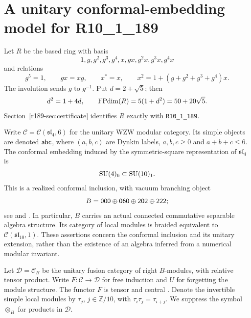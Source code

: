 \section{A unitary conformal-embedding model for R10\_1\_189}\label{sec:r189-model}

Let $R$ be the based ring with basis
\[
  1,g,g^2,g^3,g^4,x,gx,g^2x,g^3x,g^4x
\]
and relations
\begin{equation}\label{r189-eq:ring}
 g^5=1,\qquad gx=xg,\qquad x^*=x,\qquad
 x^2=1+(g+g^2+g^3+g^4)x.
\end{equation}
The involution sends $g$ to $g^{-1}$. Put $d=2+\sqrt5$; then
\begin{equation}\label{r189-eq:dim}
 d^2=1+4d,\qquad \operatorname{FPdim}(R)=5(1+d^2)=50+20\sqrt5.
\end{equation}
Section~\ref{r189-sec:certificate} identifies $R$ exactly with
\texttt{R10\_1\_189}.

Write $\mathcal{C}=\mathcal{C}(\mathfrak{sl}_4,6)$ for the unitary WZW modular category.
Its simple objects are denoted $\mathsf{abc}$, where $(a,b,c)$ are Dynkin
labels, $a,b,c\geq0$ and $a+b+c\leq6$. The conformal embedding induced by
the symmetric-square representation of $\mathfrak{sl}_4$ is
\begin{equation}\label{r189-eq:embedding}
 \mathrm{SU}(4)_6\subset\mathrm{SU}(10)_1.
\end{equation}
This is a realized conformal inclusion, with vacuum branching object
\begin{equation}\label{r189-eq:B}
 B=\mathsf{000}\oplus\mathsf{060}\oplus\mathsf{202}\oplus\mathsf{222};
\end{equation}
see \cite[p.~29 of the arXiv version]{BE} and
\cite[\S\S1.4.3--1.4.5]{CS}. In particular, $B$ carries an actual
connected commutative separable algebra structure. Its category of local
modules is braided equivalent to $\mathcal{C}(\mathfrak{sl}_{10},1)$.
These assertions concern the conformal inclusion and its unitary
extension, rather than the existence of an algebra inferred from a
numerical modular invariant.

Let $\mathcal{D}=\mathcal{C}_B$ be the unitary fusion category of right $B$-modules, with
relative tensor product. Write $F:\mathcal{C}\to\mathcal{D}$ for free induction and $U$ for
forgetting the module structure. The functor $F$ is tensor and central
\cite[\S\S3.3--3.4, equation~(17)]{DMNO}. Denote the invertible simple
local modules by $\tau_j$, $j\in\mathbb Z/10$, with
$\tau_i\tau_j=\tau_{i+j}$. We suppress the symbol $\otimes_B$ for
products in $\mathcal{D}$.

